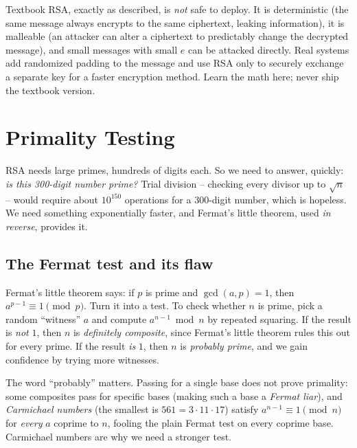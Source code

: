 \begin{trapbox}
Textbook RSA, exactly as described, is \emph{not} safe to deploy. It is
deterministic (the same message always encrypts to the same ciphertext, leaking
information), it is malleable (an attacker can alter a ciphertext to predictably change the decrypted message), and small messages with small $e$ can be attacked
directly. Real systems add randomized padding to the message and use RSA only to securely exchange a separate key for a faster encryption method. Learn the math here; never ship the textbook version.
\end{trapbox}

\section{Primality Testing}
\label{ch30:primality}

RSA needs large primes, hundreds of digits each. So we need to answer, quickly:
\emph{is this 300-digit number prime?} Trial division -- checking every divisor
up to $\sqrt n$ -- would require about $10^{150}$ operations for a $300$-digit
number, which is hopeless. We need something exponentially faster, and
Fermat's little theorem, used \emph{in reverse}, provides it.

\subsection{The Fermat test and its flaw}

Fermat's little theorem says: if $p$ is prime and $\gcd(a,p)=1$, then $a^{p-1}
\equiv 1 \pmod p$. Turn it into a test. To check whether $n$ is prime, pick a
random ``witness'' $a$ and compute $a^{n-1} \bmod n$ by repeated squaring. If
the result is \emph{not} $1$, then $n$ is \emph{definitely composite}, since
Fermat's little theorem rules this out for every prime. If the result \emph{is}
$1$, then $n$ is \emph{probably prime}, and we gain confidence by trying more
witnesses.

\begin{trapbox}
The word ``probably'' matters. Passing for a single base does not prove
primality: some composites pass for specific bases (making such a base a
\emph{Fermat liar}), and \emph{Carmichael numbers} (the smallest is
$561 = 3\cdot 11\cdot 17$) satisfy $a^{n-1}\equiv 1 \pmod n$ for \emph{every}
$a$ coprime to $n$, fooling the plain Fermat test on every coprime base.
Carmichael numbers are why we need a stronger test.
\end{trapbox}

